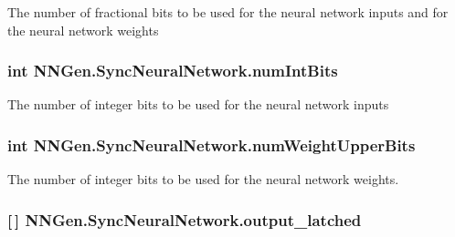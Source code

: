 The number of fractional bits to be used for the neural network inputs and for the neural network weights 

\hypertarget{class_n_n_gen_1_1_sync_neural_network_a66e287c50de3ae1932ea768fc3fa54fc}{}
\subsubsection[{num\+Int\+Bits}]{\setlength{\rightskip}{0pt plus 5cm}int N\+N\+Gen.\+Sync\+Neural\+Network.\+num\+Int\+Bits\hspace{0.3cm}{\ttfamily [get]}}\label{class_n_n_gen_1_1_sync_neural_network_a66e287c50de3ae1932ea768fc3fa54fc}


The number of integer bits to be used for the neural network inputs 

\hypertarget{class_n_n_gen_1_1_sync_neural_network_afe97a4c00e87742409fe9a5a16922822}{}
\subsubsection[{num\+Weight\+Upper\+Bits}]{\setlength{\rightskip}{0pt plus 5cm}int N\+N\+Gen.\+Sync\+Neural\+Network.\+num\+Weight\+Upper\+Bits\hspace{0.3cm}{\ttfamily [get]}}\label{class_n_n_gen_1_1_sync_neural_network_afe97a4c00e87742409fe9a5a16922822}


The number of integer bits to be used for the neural network weights. 

\hypertarget{class_n_n_gen_1_1_sync_neural_network_a9d1fb07536404577262d6c5ccecf2361}{}
\subsubsection[{output\+\_\+latched}]{ \mbox{[}$\,$\mbox{]} N\+N\+Gen.\+Sync\+Neural\+Network.\+output\+\_\+latched\hspace{0.3cm}{\ttfamily [get]}}\label{class_n_n_gen_1_1_sync_neural_network_a9d1fb07536404577262d6c5ccecf2361}


